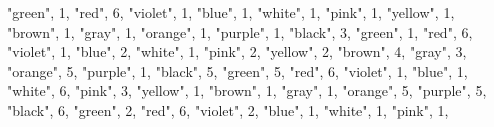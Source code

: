 \documentclass[
]{article}
\newenvironment{Shaded}{\begin{snugshade}}{\end{snugshade}}
\newcommand{\DecValTok}[1]{\textcolor[rgb]{0.00,0.00,0.81}{#1}}
\newcommand{\NormalTok}[1]{#1}
\newcommand{\StringTok}[1]{\textcolor[rgb]{0.31,0.60,0.02}{#1}}
\begin{document}
\begin{Shaded}
\begin{Highlighting}[]
  \StringTok{"green"}\NormalTok{, }\DecValTok{1}\NormalTok{,}
  \StringTok{"red"}\NormalTok{, }\DecValTok{6}\NormalTok{, }
  \StringTok{"violet"}\NormalTok{, }\DecValTok{1}\NormalTok{,}
  \StringTok{"blue"}\NormalTok{, }\DecValTok{1}\NormalTok{,}
  \StringTok{"white"}\NormalTok{, }\DecValTok{1}\NormalTok{,}
  \StringTok{"pink"}\NormalTok{, }\DecValTok{1}\NormalTok{,}
  \StringTok{"yellow"}\NormalTok{, }\DecValTok{1}\NormalTok{,}
  \StringTok{"brown"}\NormalTok{, }\DecValTok{1}\NormalTok{,}
  \StringTok{"gray"}\NormalTok{, }\DecValTok{1}\NormalTok{,}
  \StringTok{"orange"}\NormalTok{, }\DecValTok{1}\NormalTok{,}
  \StringTok{"purple"}\NormalTok{, }\DecValTok{1}\NormalTok{,}
    \StringTok{"black"}\NormalTok{, }\DecValTok{3}\NormalTok{,}
  \StringTok{"green"}\NormalTok{, }\DecValTok{1}\NormalTok{,}
  \StringTok{"red"}\NormalTok{, }\DecValTok{6}\NormalTok{,}
  \StringTok{"violet"}\NormalTok{, }\DecValTok{1}\NormalTok{,}
  \StringTok{"blue"}\NormalTok{, }\DecValTok{2}\NormalTok{,}
  \StringTok{"white"}\NormalTok{, }\DecValTok{1}\NormalTok{, }
  \StringTok{"pink"}\NormalTok{, }\DecValTok{2}\NormalTok{,}
  \StringTok{"yellow"}\NormalTok{, }\DecValTok{2}\NormalTok{,}
  \StringTok{"brown"}\NormalTok{, }\DecValTok{4}\NormalTok{,}
  \StringTok{"gray"}\NormalTok{, }\DecValTok{3}\NormalTok{,}
  \StringTok{"orange"}\NormalTok{, }\DecValTok{5}\NormalTok{,}
  \StringTok{"purple"}\NormalTok{, }\DecValTok{1}\NormalTok{,}
    \StringTok{"black"}\NormalTok{, }\DecValTok{5}\NormalTok{,}
  \StringTok{"green"}\NormalTok{, }\DecValTok{5}\NormalTok{,}
  \StringTok{"red"}\NormalTok{, }\DecValTok{6}\NormalTok{,}
  \StringTok{"violet"}\NormalTok{, }\DecValTok{1}\NormalTok{,}
  \StringTok{"blue"}\NormalTok{, }\DecValTok{1}\NormalTok{, }
  \StringTok{"white"}\NormalTok{, }\DecValTok{6}\NormalTok{,}
  \StringTok{"pink"}\NormalTok{, }\DecValTok{3}\NormalTok{,}
  \StringTok{"yellow"}\NormalTok{, }\DecValTok{1}\NormalTok{,}
  \StringTok{"brown"}\NormalTok{, }\DecValTok{1}\NormalTok{,}
  \StringTok{"gray"}\NormalTok{, }\DecValTok{1}\NormalTok{,}
  \StringTok{"orange"}\NormalTok{, }\DecValTok{5}\NormalTok{,}
  \StringTok{"purple"}\NormalTok{, }\DecValTok{5}\NormalTok{,}
    \StringTok{"black"}\NormalTok{, }\DecValTok{6}\NormalTok{,}
  \StringTok{"green"}\NormalTok{, }\DecValTok{2}\NormalTok{,}
  \StringTok{"red"}\NormalTok{, }\DecValTok{6}\NormalTok{,}
  \StringTok{"violet"}\NormalTok{, }\DecValTok{2}\NormalTok{,}
  \StringTok{"blue"}\NormalTok{, }\DecValTok{1}\NormalTok{,}
  \StringTok{"white"}\NormalTok{, }\DecValTok{1}\NormalTok{,}
  \StringTok{"pink"}\NormalTok{, }\DecValTok{1}\NormalTok{,}

\end{Highlighting}
\end{Shaded}
\end{document}
